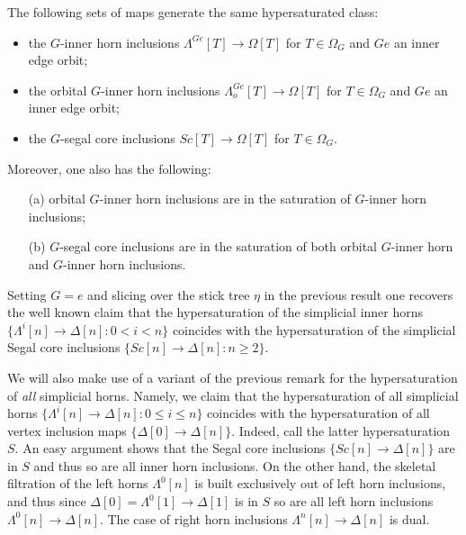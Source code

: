 \documentclass[a4paper,10pt,draft]{article}%
\begin{document}
\begin{proposition}\label{HYPER PROP}
The following sets of maps generate the same hypersaturated class:
\begin{itemize}
\item the $G$-inner horn inclusions
$\Lambda^{Ge} [T] \to \Omega[T]$ for $T \in \Omega_G$ and $Ge$ an inner edge orbit; 
\item the orbital $G$-inner horn inclusions
$\Lambda^{Ge}_o [T] \to \Omega[T]$ for $T \in \Omega_G$ and $Ge$ an inner edge orbit; 
\item the $G$-segal core inclusions
$Sc [T] \to \Omega[T]$ for $T \in \Omega_G$.
\end{itemize}
Moreover, one also has the following:
\begin{itemize}
	\item[(a)] orbital $G$-inner horn inclusions are in the saturation of $G$-inner horn inclusions;
	\item[(b)] $G$-segal core inclusions are in the saturation of both orbital $G$-inner horn and $G$-inner horn inclusions.
\end{itemize}
\end{proposition}


\begin{remark}
	Setting $G=e$ and slicing over the stick tree $\eta$ in the previous result
	one recovers the well known claim that 
	the hypersaturation of the simplicial inner horns
	$\{\Lambda^i[n] \to \Delta[n] \colon 0< i < n\}$
	coincides with the hypersaturation of the simplicial Segal core inclusions
	$\{Sc[n] \to \Delta[n]\colon n \geq 2\}$.
\end{remark}


\begin{remark}\label{HYPERSATKAN REM}
	We will also make use of a variant of the previous remark for the hypersaturation of \textit{all} simplicial horns.
	Namely, we claim that the hypersaturation of all simplicial horns 
	$\{\Lambda^i[n] \to \Delta[n] \colon 0 \leq i \leq n\}$
	coincides with the hypersaturation of all vertex inclusion maps
	$\{\Delta[0] \to \Delta[n]\}$.
	Indeed, call the latter hypersaturation $S$. 
	An easy argument shows that the Segal core inclusions 
	$\{Sc[n] \to \Delta[n]\}$ are in $S$ and thus so are all inner horn inclusions. On the other hand, the skeletal filtration of the left horns $\Lambda^0[n]$ is built exclusively out of left horn inclusions, and thus since $\Delta[0]=\Lambda^0[1] \to \Delta[1]$ is in $S$ so are all left horn inclusions 
	$\Lambda^0[n] \to \Delta[n]$. The case of right horn inclusions $\Lambda^n[n] \to \Delta[n]$ is dual.
\end{remark}
\end{document}

